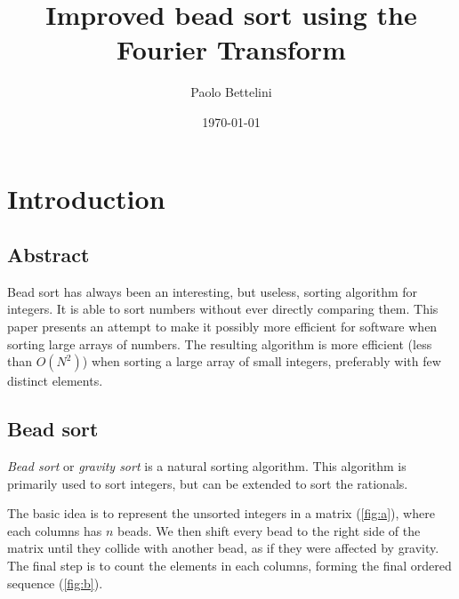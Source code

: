 \documentclass{article}
\title{Improved bead sort using the Fourier Transform}
\author{Paolo Bettelini}
\date{\today}
\begin{document}
\maketitle

\section{Introduction}

\subsection{Abstract}

Bead sort has always been an interesting, but useless, sorting algorithm
for integers. It is able to sort numbers without ever directly comparing them.
This paper presents an attempt to make it possibly more efficient
for software when sorting large arrays of numbers.
The resulting algorithm is more efficient (less than \(O(N^2)\)) when sorting a large array of small integers,
preferably with few distinct elements.

\subsection{Bead sort}

\textit{Bead sort}\cite{beadsort} or \textit{gravity sort}
is a natural sorting algorithm.
This algorithm is primarily used to sort
integers, but can be extended to sort the rationals.

The basic idea is to represent the unsorted integers
in a matrix (\ref{fig:a}), where each columns has \(n\) beads.
We then shift every bead to the right side of the matrix
until they collide with another bead,
as if they were affected by gravity.
The final step is to count the elements in each columns,
forming the final ordered sequence (\ref{fig:b}).
\end{document}
